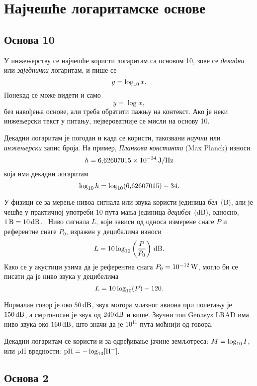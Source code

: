 \section{Најчешће логаритамске основе}

\subsection{Основа 10}

У инжењерству се најчешће користи логаритам са основом 10,
зове се {\sl декадни\/} или {\sl заједнички\/} логаритам, и пише се
$$
y=\log_{10} x.
$$
Понекад се може видети и само
$$
y=\log x,
$$
без навођења основе, али треба обратити пажњу на контекст.
Ако је неки инжењерски текст у питању, нејвероватније се мисли на основу 10.

Декадни логаритам је погодан и када се користи, такозвани
{\sl научни\/} или {\sl инжењерски\/} запис броја.
На пример, {\sl Планкова константа\/} (Max Planck) износи
$$
h=6\.62607015\puta 10^{-34}\um{J/Hz}
$$
која има декадни логаритам
$$
\logten h=\logten(6\.62607015) - 34.
$$

У физици се за мерење нивоа сигнала или звука користи јединица {\sl бел\/}~(B), али је чешће
у практичној употреби 10 пута мања јединица {\sl децибел\/}~(dB), односно, $1\,\hbox{\rm B}=10\,\hbox{\rm dB}$. \
Ниво сигнала $L$, који зависи
од односа измерене снаге $P$ и референтне снаге $P_0$, изражен у децибалима износи
$$
L=10\log_{10}\left(\frac{P}{P_0}\right)\,\hbox{\rm dB}.
$$
Како се у акустици узима да је референтна снага $P_0=10^{-12}\,\hbox{\rm W}$, могло би се писати
да је ниво звука у децибелима
$$
L=10\log_{10}(P)-120.
$$

Нормалан говор је око $50\,\hbox{\rm dB}$,
звук мотора млазног авиона при полетању је $150\,\hbox{\rm dB}$, 
а смртоносан је звук од $240\,\hbox{\rm dB}$ и више.
Звучни топ {\sf Genasys LRAD} има ниво звука око $160\,\hbox{\rm dB}$,
што значи да је $10^{11}$ пута моћнији од говора.

Декадни логаритам се користи и за одређивање јачине земљотреса: $M=\log_{10} I$, или 
pH вредности: ${\rm pH}=-\log_{10}[{\rm H}^+]$.

\subsection{Основа 2}

